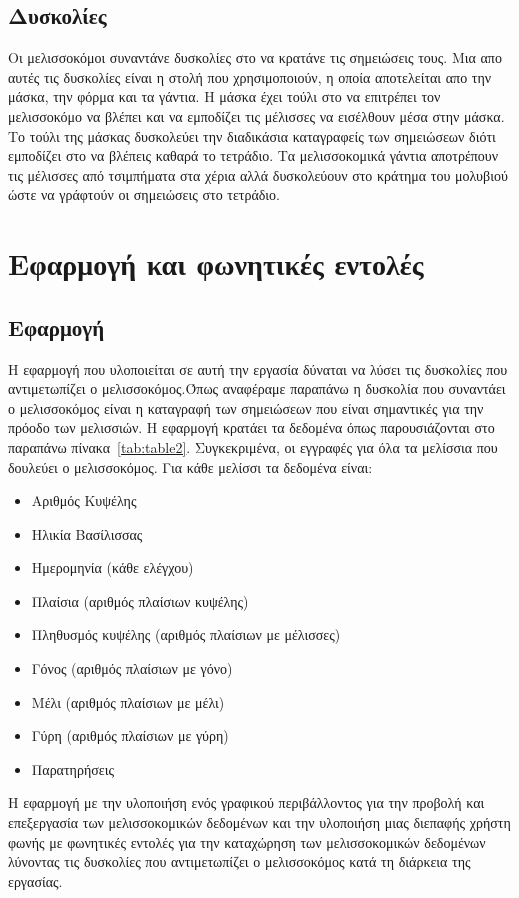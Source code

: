 \documentclass[oneside, 12pt]{book}
\begin{document}
\section{Δυσκολίες}\label{sec:δυσκολίες}
Οι μελισσοκόμοι συναντάνε δυσκολίες στο να κρατάνε τις σημειώσεις τους. Μια απο αυτές τις δυσκολίες είναι η στολή που χρησιμοποιούν, η οποία αποτελείται απο την μάσκα, την φόρμα και τα γάντια. Η μάσκα έχει τούλι στο να επιτρέπει τον μελισσοκόμο να βλέπει και να εμποδίζει τις μέλισσες να εισέλθουν μέσα στην μάσκα. Το τούλι της μάσκας δυσκολεύει την διαδικάσια καταγραφείς των σημειώσεων διότι εμποδίζει στο να βλέπεις καθαρά το τετράδιο. Τα μελισσοκομικά γάντια αποτρέπουν τις μέλισσες από τσιμπήματα στα χέρια αλλά δυσκολεύουν στο κράτημα του μολυβιού ώστε να γράφτούν οι σημειώσεις στο τετράδιο.
\chapter{Εφαρμογή και φωνητικές εντολές}
\label{ch:εφαρμογή-και-φωνητικές-εντολές}
\section{Εφαρμογή}
\label{sec:εφαρμογή}
Η εφαρμογή που υλοποιείται σε αυτή την εργασία δύναται να λύσει τις δυσκολίες που αντιμετωπίζει ο μελισσοκόμος.Όπως αναφέραμε παραπάνω η δυσκολία που συναντάει ο μελισσοκόμος είναι η καταγραφή των σημειώσεων που είναι σημαντικές για την πρόοδο των μελισσιών. Η εφαρμογή κρατάει τα δεδομένα όπως παρουσιάζονται στο παραπάνω πίνακα~\ref{tab:table2}. Συγκεκριμένα, οι εγγραφές για όλα τα μελίσσια που δουλεύει ο μελισσοκόμος.
\newline
Για κάθε μελίσσι τα δεδομένα είναι:
\begin{itemize}
  \item Αριθμός Κυψέλης
  \item Ηλικία Βασίλισσας
  \item Ημερομηνία (κάθε ελέγχου)
  \item Πλαίσια (αριθμός πλαίσιων κυψέλης)
  \item Πληθυσμός κυψέλης (αριθμός πλαίσιων με μέλισσες)
  \item Γόνος (αριθμός πλαίσιων με γόνο)
  \item Μέλι (αριθμός πλαίσιων με μέλι)
  \item Γύρη (αριθμός πλαίσιων με γύρη)
  \item Παρατηρήσεις
\end{itemize}
Η εφαρμογή με την υλοποιήση ενός γραφικού περιβάλλοντος για την προβολή και επεξεργασία των μελισσοκομικών δεδομένων και την υλοποιήση μιας διεπαφής χρήστη φωνής με φωνητικές εντολές για την καταχώρηση των μελισσοκομικών δεδομένων λύνοντας τις δυσκολίες που αντιμετωπίζει ο μελισσοκόμος κατά τη διάρκεια της εργασίας.
\end{document}
